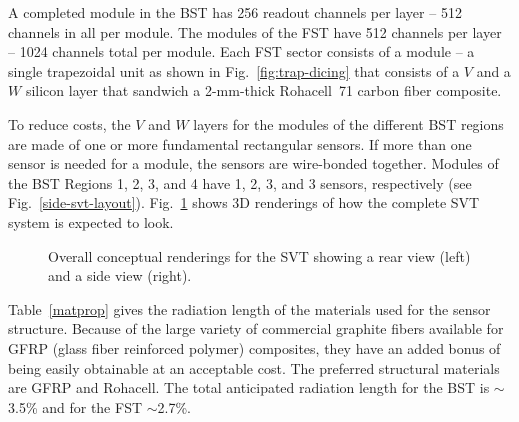 A completed module in the BST has 256 readout channels per layer -- 512 
channels in all per module.  The modules of the FST have 512 channels per 
layer -- 1024 channels total per module.  Each FST sector consists of a 
module -- a single trapezoidal unit as shown in Fig.~\ref{fig:trap-dicing} 
that consists of a $V$ and a $W$ silicon layer that sandwich a 2-mm-thick 
Rohacell~71 carbon fiber composite.   

To reduce costs, the $V$ and $W$ layers for the modules of the different 
BST regions are made of one or more fundamental rectangular sensors.  If 
more than one sensor is needed for a module, the sensors are wire-bonded 
together.  Modules of the BST Regions 1, 2, 3, and 4 have 1, 2, 3, and 3 
sensors, respectively (see Fig.~\ref{side-svt-layout}).  Fig.~\ref{svt_views}
shows 3D renderings of how the complete SVT system is expected to look.  

\begin{figure}[htbp]
\vspace{6.7cm}
\caption{\small{Overall conceptual renderings for the SVT showing a rear
view (left) and a side view (right).}}
\label{svt_views}
\end{figure}

Table~\ref{matprop} gives the radiation length of the materials used for 
the sensor structure.  Because of the large variety of commercial graphite 
fibers available for GFRP (glass fiber reinforced polymer) composites, they 
have an added bonus of being easily obtainable at an acceptable cost.  The 
preferred structural materials are GFRP and Rohacell.  The total anticipated 
radiation length for the BST is $\sim$3.5\% and for the FST $\sim$2.7\%. 

